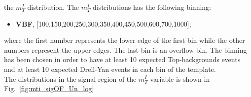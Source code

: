 the $m_T^I$ distribution.
The $m_T^I$ distributions has the following binning:
\begin{itemize}
\item {\bf VBF}, [100,150,200,250,300,350,400,450,500,600,700,1000];
\end{itemize}
where the first number represents the lower edge of the first bin while the other numbers represent the upper edges. The last bin is an overflow bin. 
The binning has been chosen in order to have at least 10 expected Top-backgrounds events and at least 10  expected  Drell-Yan events in each bin of the template.\\
The distributions in the signal region of the $m_T^I$ variable is shown in  Fig.~\ref{fig:mti_sigOF_Un_log} 
\begin{figure}[htbp]
\centering
{}
\\
\end{figure}
